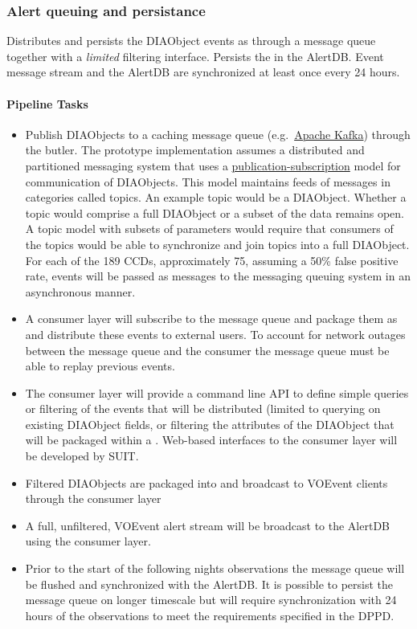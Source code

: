 \subsubsection{Alert queuing and persistance}
\label{sec:apQueue}
Distributes and persists the DIAObject events as \VOEvents through a message queue together with a {\it limited} filtering interface. Persists the \VOEvents in the AlertDB. Event message stream and the AlertDB are synchronized at least once every 24 hours.


\paragraph{Pipeline Tasks}
\begin{itemize}
\item Publish DIAObjects to a caching message queue (e.g.\ \hyperref[http://kafka.apache.org]{Apache Kafka}) through the butler. The prototype implementation assumes a distributed and partitioned messaging system that uses a \hyperref[https://en.wikipedia.org/wiki/Publish_subscribe_pattern]{publication-subscription} model for communication of DIAObjects. This model maintains feeds of messages in categories called topics. An example topic would be a DIAObject. Whether a topic would comprise a full DIAObject or a subset of the data remains open. A topic model with subsets of parameters would require that consumers of the topics would be able to synchronize and join topics into a full DIAObject. For each of the 189 CCDs, approximately 75, assuming a 50\% false positive rate, events will be passed as messages to the messaging queuing system in an asynchronous manner.
\item A consumer layer will subscribe to the  message queue and package them as \VOEvents and distribute these events to external users. To account for network outages between the message queue and the consumer the message queue must be able to replay previous events. 
\item  The consumer layer will provide a command line API to define simple queries or filtering of the events that will be distributed (limited to querying on existing DIAObject fields, or filtering the attributes of the DIAObject that will be packaged within a \VOEvent. Web-based interfaces to the consumer layer will be developed by SUIT. 
\item Filtered DIAObjects are packaged into \VOEvents and broadcast to VOEvent clients through the consumer layer
\item A full, unfiltered, VOEvent alert stream will be broadcast to the AlertDB using the consumer layer. 
\item Prior to the start of the following nights observations the message queue will be flushed and synchronized with the AlertDB. It is possible to persist the message queue on longer timescale but will require synchronization with 24 hours of the observations to meet the requirements specified in the DPPD.
\end{itemize}


